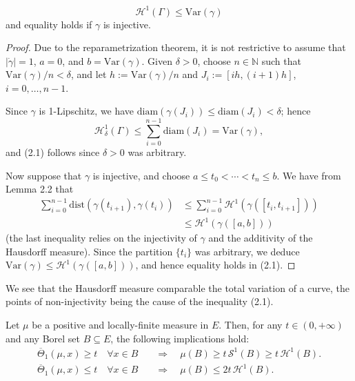 \documentclass[12pt]{article}
\begin{document}
{\begin{theorem}
    \begin{equation}
        \mathcal{H}^1(\Gamma) \leqslant \text{Var}(\gamma)
    \end{equation}
    and equality holds if $\gamma$ is injective.
\end{theorem}

\begin{proof}
    Due to the reparametrization theorem, it is not restrictive to assume that 
    $|\dot{\gamma}| = 1$, $a = 0$, and $b = \mathrm{Var}(\gamma)$. Given 
    $\delta > 0$, choose $n \in \mathbb{N}$ such that $\mathrm{Var}(\gamma)/n < \delta$, 
    and let $h := \mathrm{Var}(\gamma)/n$ and $J_i := [ih, (i+1)h]$, 
    $i = 0, \ldots, n-1$.

    Since $\gamma$ is 1-Lipschitz, we have $\mathrm{diam}(\gamma(J_i)) \leqslant 
    \mathrm{diam}(J_i) < \delta$; hence
    \[
        \mathcal{H}^1_\delta(\Gamma) \leqslant \sum_{i=0}^{n-1} \mathrm{diam}(J_i) 
        = \mathrm{Var}(\gamma),
    \]
    and (2.1) follows since $\delta > 0$ was arbitrary.

    Now suppose that $\gamma$ is injective, and choose $a \leqslant t_0 < \cdots 
    < t_n \leqslant b$. We have from Lemma 2.2 that
    \begin{align*}
        \sum_{i=0}^{n-1} \mathrm{dist}\!\left(\gamma(t_{i+1}), \gamma(t_i)\right) 
        &\leqslant \sum_{i=0}^{n-1} \mathcal{H}^1\!\left(\gamma([t_i, t_{i+1}])\right) \\
        &\leqslant \mathcal{H}^1\!\left(\gamma([a, b])\right)
    \end{align*}
    (the last inequality relies on the injectivity of $\gamma$ and the additivity 
    of the Hausdorff measure). Since the partition $\{t_i\}$ was arbitrary, we 
    deduce $\mathrm{Var}(\gamma) \leqslant \mathcal{H}^1\!\left(\gamma([a, b])\right)$, 
    and hence equality holds in (2.1).
\end{proof}

\begin{remark}
    We see that the Hausdorff measure comparable the total variation of a curve, the points of non-injectivity being the cause of the inequality (2.1).
\end{remark}

\begin{theorem}
    Let $\mu$ be a positive and locally-finite measure in $E$. Then, for any $t \in (0, +\infty)$ and any Borel set $B \subseteq E$, the following implications hold:
    \begin{align}
    \overline{\Theta}_1(\mu, x) \ge t \quad \forall x \in B \quad &\Longrightarrow \quad \mu(B) \ge t \, \mathcal{S}^1(B) \ge t \, \mathcal{H}^1(B).  \\
    \overline{\Theta}_1(\mu, x) \le t \quad \forall x \in B \quad &\Longrightarrow \quad \mu(B) \le 2t \, \mathcal{H}^1(B). 
    \end{align}
\end{theorem}

}
\end{document}

